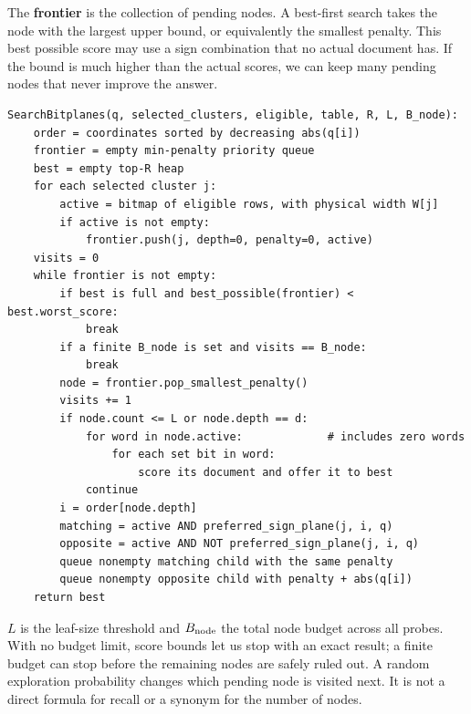 The \textbf{frontier} is the collection of pending nodes. A best-first search takes the node
with the largest upper bound, or equivalently the smallest penalty. This best possible score may use
a sign combination that no actual document has. If the bound is much higher than the actual scores, we can keep
many pending nodes that never improve the answer.

\par\noindent\begin{minipage}{\linewidth}
\begin{lstlisting}[caption={Dense bitplane search across the selected clusters.}]
SearchBitplanes(q, selected_clusters, eligible, table, R, L, B_node):
    order = coordinates sorted by decreasing abs(q[i])
    frontier = empty min-penalty priority queue
    best = empty top-R heap
    for each selected cluster j:
        active = bitmap of eligible rows, with physical width W[j]
        if active is not empty:
            frontier.push(j, depth=0, penalty=0, active)
    visits = 0
    while frontier is not empty:
        if best is full and best_possible(frontier) < best.worst_score:
            break
        if a finite B_node is set and visits == B_node:
            break
        node = frontier.pop_smallest_penalty()
        visits += 1
        if node.count <= L or node.depth == d:
            for word in node.active:             # includes zero words
                for each set bit in word:
                    score its document and offer it to best
            continue
        i = order[node.depth]
        matching = active AND preferred_sign_plane(j, i, q)
        opposite = active AND NOT preferred_sign_plane(j, i, q)
        queue nonempty matching child with the same penalty
        queue nonempty opposite child with penalty + abs(q[i])
    return best
\end{lstlisting}
\end{minipage}\par
$L$ is the leaf-size threshold and $B_{\rm node}$ the total node budget across all probes.
With no budget limit, score bounds let us stop with an exact result; a finite budget can stop before the
remaining nodes are safely ruled out. A random exploration probability changes which pending
node is visited next. It is not a direct formula for recall or a synonym for the number of nodes.

